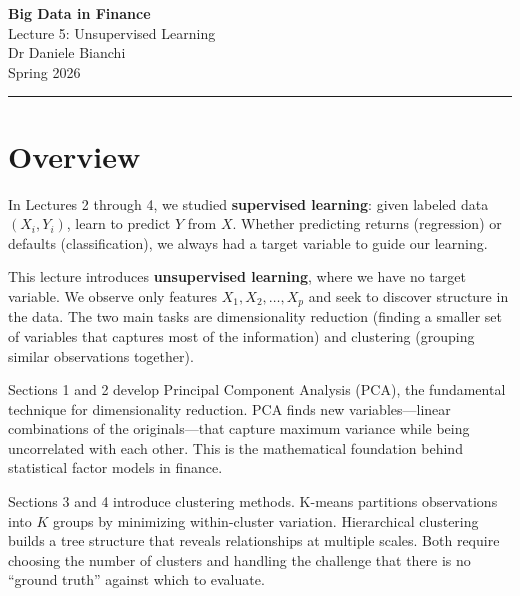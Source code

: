 \documentclass[11pt,a4paper]{article}
\newcommand{\keyword}[1]{\textbf{\textcolor{AccentOrange}{#1}}}
\begin{document}
\begin{center}
    {\LARGE\bfseries\textcolor{ThemeBlue}{Big Data in Finance}}\\[0.5em]
    {\Large Lecture 5: Unsupervised Learning}\\[1em]
    {\large Dr Daniele Bianchi}\\[0.5em]
    {\normalsize Spring 2026}
\end{center}

\vspace{1em}
\hrule
\vspace{1em}

\tableofcontents

\vspace{2cm}

\section*{Overview}

In Lectures 2 through 4, we studied \keyword{supervised learning}: given labeled data $(X_i, Y_i)$, learn to predict $Y$ from $X$. Whether predicting returns (regression) or defaults (classification), we always had a target variable to guide our learning.

This lecture introduces \keyword{unsupervised learning}, where we have no target variable. We observe only features $X_1, X_2, \ldots, X_p$ and seek to discover structure in the data. The two main tasks are dimensionality reduction (finding a smaller set of variables that captures most of the information) and clustering (grouping similar observations together).

Sections 1 and 2 develop Principal Component Analysis (PCA), the fundamental technique for dimensionality reduction. PCA finds new variables---linear combinations of the originals---that capture maximum variance while being uncorrelated with each other. This is the mathematical foundation behind statistical factor models in finance.

Sections 3 and 4 introduce clustering methods. K-means partitions observations into $K$ groups by minimizing within-cluster variation. Hierarchical clustering builds a tree structure that reveals relationships at multiple scales. Both require choosing the number of clusters and handling the challenge that there is no ``ground truth'' against which to evaluate.
\end{document}
